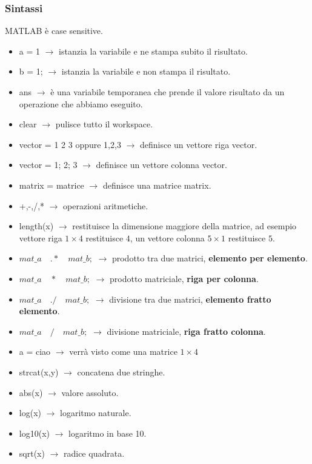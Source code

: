 \subsubsection{Sintassi}
MATLAB è case sensitive.
\begin{itemize}
    \item a = 1 $\rightarrow$ istanzia la variabile e ne stampa subito il risultato.
    \item b = 1; $\rightarrow$ istanzia la variabile e non stampa il risultato.
    \item ans $\rightarrow$ è una variabile temporanea che prende il valore risultato da un operazione che abbiamo eseguito.
    \item clear $\rightarrow$ pulisce tutto il workspace.
    \newpage
    \item vector = {1 2 3} oppure {1,2,3} $\rightarrow$ definisce un vettore riga vector.
    \item vector = {1; 2; 3} $\rightarrow$ definisce un vettore colonna vector.
    \item matrix = matrice $\rightarrow$ definisce una matrice matrix.
    \item +,-,/,* $\rightarrow$ operazioni aritmetiche.
    \item length(x) $\rightarrow$ restituisce la dimensione maggiore della matrice, ad esempio vettore riga $1\times 4$ restituisce $4$, un vettore colonna $5\times 1$ restituisce $5$.
    \item $mat\_a \quad .* \quad mat\_b;$ $\rightarrow$ prodotto tra due matrici, \textbf{elemento per elemento}.
    \item $mat\_a \quad * \quad mat\_b;$ $\rightarrow$ prodotto matriciale, \textbf{riga per colonna}.
    \item $mat\_a \quad ./ \quad mat\_b;$ $\rightarrow$ divisione tra due matrici, \textbf{elemento fratto elemento}.
    \item $mat\_a \quad / \quad mat\_b;$ $\rightarrow$ divisione matriciale, \textbf{riga fratto colonna}.
    \item a = ciao $\rightarrow$ verrà visto come una matrice $1 \times 4$
    \item strcat(x,y) $\rightarrow$ concatena due stringhe.
    \item abs(x) $\rightarrow$ valore assoluto.
    \item log(x) $\rightarrow$ logaritmo naturale.
    \item log10(x) $\rightarrow$ logaritmo in base 10.
    \item sqrt(x) $\rightarrow$ radice quadrata.

\end{itemize}

